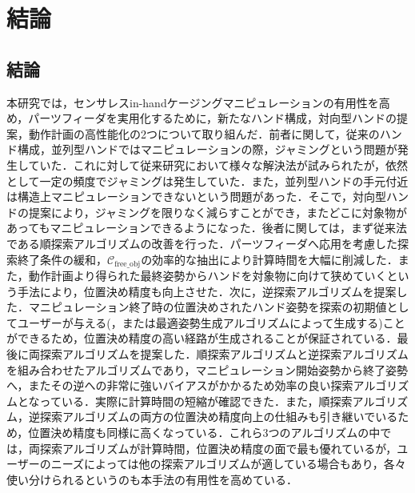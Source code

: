\documentclass[a4paper,twoside,12pt,papersize, dvipdfmx]{iirthesis}
\begin{document}
    \newcommand{\figref}[1]{\figurename\ref{#1}}
    \newcommand{\tabref}[1]{\tablename\ref{#1}}
    \renewcommand{\eqref}[1]{式~(\ref{#1})}
    \newcommand{\chapref}[1]{\ref{#1}章}
    \newcommand{\secref}[1]{\ref{#1}節}
    \newcommand{\ssecref}[1]{\ref{#1}項}
    \newcommand{\appref}[1]{付録\ref{#1}}
\fi

\minitoc

\chapter{結論}\label{chap::conclusion}
\section{結論}\label{sec::conclusion::conclusion}
本研究では，センサレスin-handケージングマニピュレーションの有用性を高め，パーツフィーダを実用化するために，新たなハンド構成，対向型ハンドの提案，動作計画の高性能化の2つについて取り組んだ．前者に関して，従来のハンド構成，並列型ハンドではマニピュレーションの際，ジャミングという問題が発生していた．これに対して従来研究において様々な解決法が試みられたが，依然として一定の頻度でジャミングは発生していた．また，並列型ハンドの手元付近は構造上マニピュレーションできないという問題があった．そこで，対向型ハンドの提案により，ジャミングを限りなく減らすことができ，またどこに対象物があってもマニピュレーションできるようになった．後者に関しては，まず従来法である順探索アルゴリズムの改善を行った．パーツフィーダへ応用を考慮した探索終了条件の緩和，$\mathcal{C}_{\mathrm{free\_obj}}$の効率的な抽出により計算時間を大幅に削減した．また，動作計画より得られた最終姿勢からハンドを対象物に向けて狭めていくという手法により，位置決め精度も向上させた．次に，逆探索アルゴリズムを提案した．マニピュレーション終了時の位置決めされたハンド姿勢を探索の初期値としてユーザーが与える(，または最適姿勢生成アルゴリズムによって生成する)ことができるため，位置決め精度の高い経路が生成されることが保証されている．最後に両探索アルゴリズムを提案した．順探索アルゴリズムと逆探索アルゴリズムを組み合わせたアルゴリズムであり，マニピュレーション開始姿勢から終了姿勢へ，またその逆への非常に強いバイアスがかかるため効率の良い探索アルゴリズムとなっている．実際に計算時間の短縮が確認できた．また，順探索アルゴリズム，逆探索アルゴリズムの両方の位置決め精度向上の仕組みも引き継いでいるため，位置決め精度も同様に高くなっている．これら3つのアルゴリズムの中では，両探索アルゴリズムが計算時間，位置決め精度の面で最も優れているが，ユーザーのニーズによっては他の探索アルゴリズムが適している場合もあり，各々使い分けられるというのも本手法の有用性を高めている．\par
\end{document}
